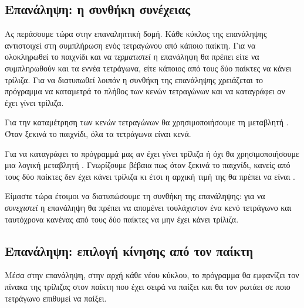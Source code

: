 \documentclass[a4paper,11pt,oneside]{book}
\begin{document}
\subsection{Επανάληψη: η συνθήκη συνέχειας}

Ας περάσουμε τώρα στην επαναληπτική δομή. Κάθε κύκλος της επανάληψης αντιστοιχεί στη συμπλήρωση ενός τετραγώνου από κάποιο παίκτη. Για να ολοκληρωθεί το παιχνίδι και να \emph{τερματιστεί} η επανάληψη θα πρέπει είτε να συμπληρωθούν και τα εννέα τετράγωνα, είτε κάποιος από τους δύο παίκτες να κάνει τρίλιζα. Για να διατυπωθεί λοιπόν η συνθήκη της επανάληψης χρειάζεται το πρόγραμμα να καταμετρά το πλήθος των κενών τετραγώνων και να καταγράφει αν έχει γίνει τρίλιζα.

Για την καταμέτρηση των κενών τετραγώνων θα χρησιμοποιήσουμε τη μεταβλητή . Όταν ξεκινά το παιχνίδι, όλα τα τετράγωνα είναι κενά.


Για να καταγράφει το πρόγραμμά μας αν έχει γίνει τρίλιζα ή όχι θα χρησιμοποιήσουμε μια λογική μεταβλητή . Γνωρίζουμε βέβαια πως όταν ξεκινά το παιχνίδι, κανείς από τους δύο παίκτες δεν έχει κάνει τρίλιζα κι έτσι η αρχική τιμή της  θα πρέπει να είναι . 


Είμαστε τώρα έτοιμοι να διατυπώσουμε τη συνθήκη της επανάληψης: για να \emph{συνεχιστεί} η επανάληψη θα πρέπει να απομένει τουλάχιστον ένα κενό τετράγωνο και ταυτόχρονα κανένας από τους δύο παίκτες να μην έχει κάνει τρίλιζα. 


\subsection{Επανάληψη: επιλογή κίνησης από τον παίκτη}

Μέσα στην επανάληψη, στην αρχή κάθε νέου κύκλου, το πρόγραμμα θα εμφανίζει τον πίνακα της τρίλιζας στον παίκτη που έχει σειρά να παίξει και θα τον ρωτάει σε ποιο τετράγωνο επιθυμεί να παίξει. 
\end{document}
